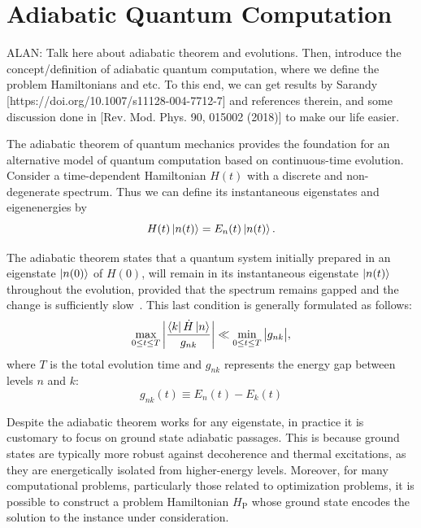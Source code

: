 \section{Adiabatic Quantum Computation}
\label{Section:AQC}
{\color{blue}ALAN: Talk here about adiabatic theorem and evolutions. Then, introduce the concept/definition of
adiabatic quantum computation, where we define the problem Hamiltonians and etc. To this end,
we can get results by Sarandy [https://doi.org/10.1007/s11128-004-7712-7] and references therein,
and some discussion done in [Rev. Mod. Phys. 90, 015002 (2018)] to make our life easier.}

The adiabatic theorem of quantum mechanics provides the foundation for an alternative model
of quantum computation based on continuous-time evolution. Consider a time-dependent Hamiltonian
$H(t)$ with a discrete and non-degenerate spectrum. Thus we can define its instantaneous
eigenstates and eigenenergies by
\begin{equation}
    H(t) \ket{n(t)} = E_n (t) \ket{n(t)}.
    \label{eq:instantaneous_eigenstates}
\end{equation}

\noindent The adiabatic theorem states that a quantum system initially prepared in an eigenstate
$\ket{n(0)}$ of  $H(0)$, will remain in its instantaneous eigenstate $\ket{n(t)}$ throughout
the evolution, provided that the spectrum remains gapped and the change is sufficiently
slow~\cite{sarandy_consistency_2004,albash_adiabatic_2018}. This last condition is generally formulated as follows:
\begin{equation}
    \max_{0 \leq t \leq T} \bigg| \dfrac{\bra{k} \dot{H} \ket{n}}{g_{nk}} \bigg| \ll \min_{0 \leq t \leq T} \big| g_{nk} \big|,
    \label{eq:adiabatic_condition}
\end{equation}
where $T$ is the total evolution time and $g_{nk}$ represents the energy gap between levels $n$ and $k$: 
\begin{equation}
    g_{nk}(t) \equiv E_n(t) - E_k(t)
    \label{eq:energy_gap}
\end{equation}

Despite the adiabatic theorem works for any eigenstate, in practice it is customary to focus on
ground state adiabatic passages. This is because ground states are typically more robust against
decoherence and thermal excitations, as they are energetically isolated from higher-energy levels.
Moreover, for many computational problems, particularly those related to optimization problems,
it is possible to construct a problem Hamiltonian $H_\mathrm{P}$ whose ground state encodes
the solution to the instance under consideration.

